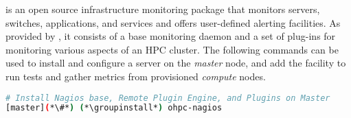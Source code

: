 \Nagios{} is an open source infrastructure monitoring package that monitors
servers, switches, applications, and services and offers user-defined alerting
facilities. As provided by \OHPC{}, it consists of a base monitoring daemon and
a set of plug-ins for monitoring various aspects of an HPC cluster.  The
following commands can be used to install and configure a \Nagios{} server on the {\em
master} node, and add the facility to run tests and gather metrics from
provisioned {\em compute} nodes.

\begin{lstlisting}[language=bash,keywords={},upquote=true]
# Install Nagios base, Remote Plugin Engine, and Plugins on Master
[master](*\#*) (*\groupinstall*) ohpc-nagios
\end{lstlisting}

